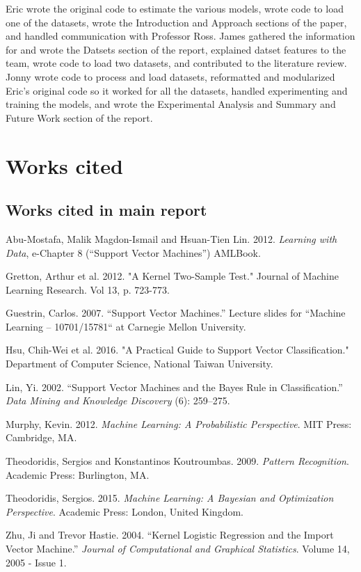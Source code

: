 \documentclass[letterpaper, 11pt]{article}
\begin{document}
Eric wrote the original code to estimate the various models, wrote code to load one of the datasets, wrote the Introduction and Approach sections of the paper, and handled communication with Professor Ross. James gathered the information for and wrote the Datsets section of the report, explained datset features to the team, wrote code to load two datasets, and contributed to the literature review. Jonny wrote code to process and load datasets, reformatted and modularized Eric's original code so it worked for all the datasets, handled experimenting and training the models, and wrote the Experimental Analysis and Summary and Future Work section of the report.

\section{Works cited}

\subsection{Works cited in main report}

Abu-Mostafa, Malik Magdon-Ismail and Hsuan-Tien Lin. 2012. \emph{Learning with Data}, e-Chapter 8 (``Support Vector Machines'') AMLBook.

Gretton, Arthur et al. 2012. "A Kernel Two-Sample Test." Journal of Machine Learning Research. Vol 13, p. 723-773.

Guestrin, Carlos. 2007. ``Support Vector Machines.'' Lecture slides for ``Machine Learning – 10701/15781`` at Carnegie Mellon University. 

Hsu, Chih-Wei et al. 2016. "A Practical Guide to Support Vector Classification." Department of Computer Science, National Taiwan University.

Lin, Yi. 2002. ``Support Vector Machines and the Bayes Rule in Classification.'' \emph{Data Mining and Knowledge Discovery} (6): 259–275.

Murphy, Kevin. 2012. \emph{Machine Learning: A Probabilistic Perspective}. MIT Press: Cambridge, MA.

Theodoridis, Sergios and Konstantinos Koutroumbas. 2009. \emph{Pattern Recognition}. Academic Press: Burlington, MA.

Theodoridis, Sergios. 2015. \emph{Machine Learning: A Bayesian and Optimization Perspective}. Academic Press: London, United Kingdom.

Zhu, Ji and Trevor Hastie. 2004. ``Kernel Logistic Regression and the Import Vector Machine.'' \emph{Journal of Computational and Graphical Statistics}.  
Volume 14, 2005 - Issue 1.
\end{document}
